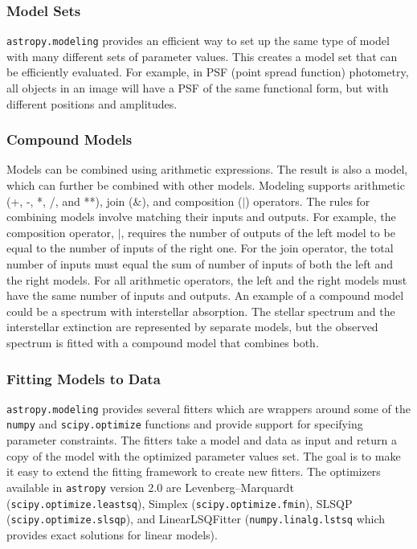 \documentclass[modern]{aastex62}
\newcommand{\package}[1]{\texttt{#1}\xspace}
\newcommand{\astropypkg}{\package{astropy}}
\begin{document}
\subsubsection{Model Sets}

\package{astropy.modeling} provides an efficient way to set up the same type of model with many different sets of parameter values.
This creates a model set that can be efficiently evaluated. For example, in PSF (point spread function) photometry, all objects in an image will have a PSF of the same functional form, but with different positions and amplitudes.

\subsubsection{Compound Models}
Models can be combined using arithmetic expressions. The result is also a model, which can further be combined with other models. Modeling supports arithmetic (+, -, *, /, and **), join ($\&$), and composition ($|$) operators. The rules for combining models involve matching their inputs and outputs. For example, the composition operator, $|$, requires the number of outputs of the left model to be equal to the number of inputs of the right one. For the join operator, the total number of inputs must equal the sum of number of inputs of both the left and the right models. For all arithmetic operators, the left and the right models must have the same number of inputs and outputs. An example of a compound model could be a spectrum with interstellar absorption. The stellar spectrum and the interstellar extinction are represented by separate models, but the observed spectrum is fitted with a compound model that combines both.

\subsubsection{Fitting Models to Data}

\package{astropy.modeling} provides several fitters which are wrappers around some of the \texttt{numpy} and \texttt{scipy.optimize} functions and provide support for specifying parameter constraints. The fitters take a model and data as input and return a copy of the model with the optimized parameter values set. The goal is to make it easy to extend the fitting framework to create new fitters. The optimizers available in \astropypkg version 2.0 are Levenberg--Marquardt (\texttt{scipy.optimize.leastsq}), Simplex (\texttt{scipy.optimize.fmin}), SLSQP (\texttt{scipy.optimize.slsqp}), and LinearLSQFitter (\texttt{numpy.linalg.lstsq} which provides exact solutions for linear models).
\end{document}
